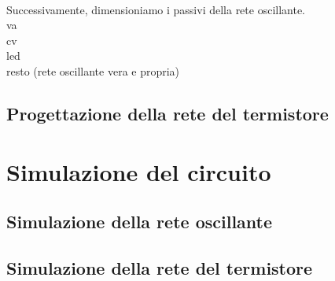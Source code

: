 \documentclass{report}
\begin{document}
\\Successivamente, dimensioniamo i passivi della rete oscillante.
\\va
\\cv
\\ led
\\ resto (rete oscillante vera e propria)

\subsection{Progettazione della rete del termistore}

\newpage
\section{Simulazione del circuito}
\subsection{Simulazione della rete oscillante}
\subsection{Simulazione della rete del termistore}
\end{document}
